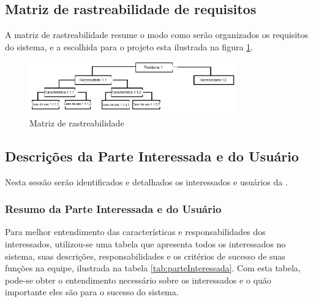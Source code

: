 \subsection{Matriz de rastreabilidade de requisitos}

A matriz de rastreabilidade resume o modo como serão organizados os requisitos do sistema, e a escolhida para o projeto esta ilustrada na figura \ref{img:rastreabilidade}.

\begin{figure}[H]
	\centering
	\includegraphics[width=0.8\textwidth]{imgModelagem/diagrama}
	\caption{Matriz de rastreabilidade}
	\label{img:rastreabilidade}
\end{figure}

\subsection{Descrições da Parte Interessada e do Usuário}

Nesta sessão serão identificados e detalhados os interessados e usuários da \nomeferramenta{}.

\subsubsection{Resumo da Parte Interessada e do Usuário}

Para melhor entendimento das características e responsabilidades dos interessados, utilizou-se uma tabela que apresenta todos os interessados no sistema, suas descrições, responsabilidades e os critérios de sucesso de suas funções na equipe, ilustrada na tabela \ref{tab:parteInteressada}. Com esta tabela, pode-se obter o entendimento necessário sobre os interessados e o quão importante eles são para o sucesso do sistema.

